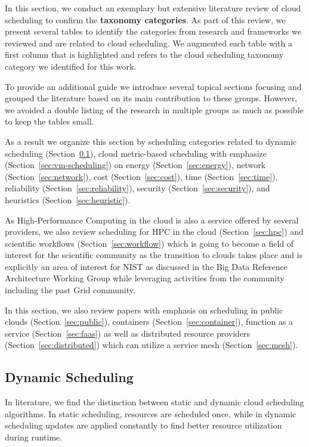 \documentclass[final,5p,times,twocolumn]{elsarticle}
\begin{document}
In this section, we conduct an exemplary but extensive literature
review of cloud scheduling to confirm the {\bf taxonomy
 categories}. As part of this review, we present several tables to identify the categories from research and frameworks we reviewed and are related to cloud scheduling. We augmented each table with a first column that is highlighted and refers to the cloud scheduling taxonomy category we identified for this work.

To provide an additional guide we introduce several topical sections focusing and grouped the literature based on its main contribution to these groups. However, we avoided a double listing of the research in multiple groups as much as possible to keep the tables small.

As a result we organize this section by scheduling categories related to 
%
dynamic scheduling (Section~\ref{sec:dynamic}),
cloud metric-based scheduling with emphasize (Section~\ref{sec:vm-scheduling}) on 
energy (Section~\ref{sec:energy}),
network (Section~\ref{sec:network}),
cost (Section~\ref{sec:cost}),
time (Section~\ref{sec:time}),
reliability (Section~\ref{sec:reliability}),
security (Section~\ref{sec:security}), 
and heuristics (Section~\ref{sec:heuristic}).

As High-Performance Computing in the cloud is also a service offered by several providers, we also review scheduling for HPC in the cloud (Section~\ref{sec:hpc}) and scientific workflows (Section~\ref{sec:workflow}) which is going to become a field of interest for the scientific community as the transition to clouds takes place and is explicitly an area of interest for NIST as discussed in the Big Data Reference Architecture Working Group while leveraging activities from the community including the past Grid community.

In this section, we also review papers with emphasis on scheduling in public clouds (Section~\ref{sec:public}), containers (Section~\ref{sec:container}), function as a service (Section~\ref{sec:faas}) as well as distributed resource providers (Section~\ref{sec:distributed}) which can utilize a service mesh (Section~\ref{sec:mesh}).





\subsection{Dynamic Scheduling}\label{sec:dynamic}

In literature, we find the distinction between static and dynamic cloud scheduling algorithms. In static scheduling, resources are scheduled once, while in dynamic scheduling updates are applied constantly to find better resource utilization during runtime.
\end{document}
